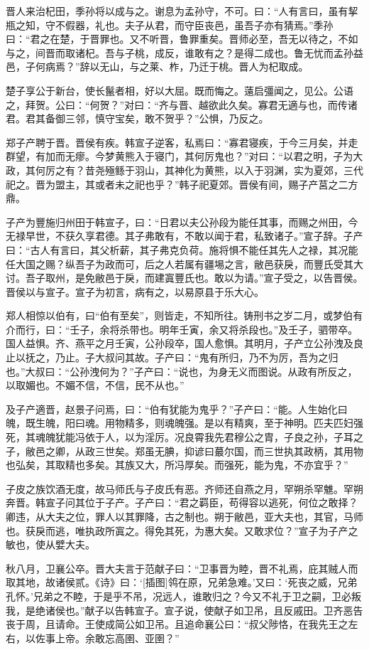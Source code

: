\documentclass[a4paper,12pt,UTF8,twoside]{ctexbook}
\begin{document}
晋人来治杞田，季孙将以成与之。谢息为孟孙守，不可。曰：“人有言曰，虽有挈瓶之知，守不假器，礼也。夫子从君，而守臣丧邑，虽吾子亦有猜焉。”季孙曰：“君之在楚，于晋罪也。又不听晋，鲁罪重矣。晋师必至，吾无以待之，不如与之，间晋而取诸杞。吾与子桃，成反，谁敢有之？是得二成也。鲁无忧而孟孙益邑，子何病焉？”辞以无山，与之莱、柞，乃迁于桃。晋人为杞取成。

楚子享公于新台，使长鬣者相，好以大屈。既而悔之。薳启彊闻之，见公。公语之，拜贺。公曰：“何贺？”对曰：“齐与晋、越欲此久矣。寡君无適与也，而传诸君。君其备御三邻，慎守宝矣，敢不贺乎？”公惧，乃反之。

郑子产聘于晋。晋侯有疾。韩宣子逆客，私焉曰：“寡君寝疾，于今三月矣，并走群望，有加而无瘳。今梦黄熊入于寝门，其何厉鬼也？”对曰：“以君之明，子为大政，其何厉之有？昔尧殛鲧于羽山，其神化为黄熊，以入于羽渊，实为夏郊，三代祀之。晋为盟主，其或者未之祀也乎？”韩子祀夏郊。晋侯有间，赐子产莒之二方鼎。

子产为豐施归州田于韩宣子，曰：“日君以夫公孙段为能任其事，而赐之州田，今无禄早世，不获久享君德。其子弗敢有，不敢以闻于君，私致诸子。”宣子辞。子产曰：“古人有言曰，其父析薪，其子弗克负荷。施将惧不能任其先人之禄，其况能任大国之赐？纵吾子为政而可，后之人若属有疆埸之言，敝邑获戾，而豐氏受其大讨。吾子取州，是免敝邑于戾，而建寘豐氏也。敢以为请。”宣子受之，以告晋侯。晋侯以与宣子。宣子为初言，病有之，以易原县于乐大心。

郑人相惊以伯有，曰“伯有至矣”，则皆走，不知所往。铸刑书之岁二月，或梦伯有介而行，曰：“壬子，余将杀带也。明年壬寅，余又将杀段也。”及壬子，驷带卒。国人益惧。齐、燕平之月壬寅，公孙段卒，国人愈惧。其明月，子产立公孙洩及良止以抚之，乃止。子大叔问其故。子产曰：“鬼有所归，乃不为厉，吾为之归也。”大叔曰：“公孙洩何为？”子产曰：“说也，为身无义而图说。从政有所反之，以取媚也。不媚不信，不信，民不从也。”

及子产適晋，赵景子问焉，曰：“伯有犹能为鬼乎？”子产曰：“能。人生始化曰魄，既生魄，阳曰魂。用物精多，则魂魄强。是以有精爽，至于神明。匹夫匹妇强死，其魂魄犹能冯依于人，以为淫厉。况良霄我先君穆公之胄，子良之孙，子耳之子，敝邑之卿，从政三世矣。郑虽无腆，抑谚曰蕞尔国，而三世执其政柄，其用物也弘矣，其取精也多矣。其族又大，所冯厚矣。而强死，能为鬼，不亦宜乎？”

子皮之族饮酒无度，故马师氏与子皮氏有恶。齐师还自燕之月，罕朔杀罕魋。罕朔奔晋。韩宣子问其位于子产。子产曰：“君之羁臣，苟得容以逃死，何位之敢择？卿违，从大夫之位，罪人以其罪降，古之制也。朔于敝邑，亚大夫也，其官，马师也。获戾而逃，唯执政所寘之。得免其死，为惠大矣。又敢求位？”宣子为子产之敏也，使从嬖大夫。

秋八月，卫襄公卒。晋大夫言于范献子曰：“卫事晋为睦，晋不礼焉，庇其贼人而取其地，故诸侯贰。《诗》曰：‘[插图]鸰在原，兄弟急难。’又曰：‘死丧之威，兄弟孔怀。’兄弟之不睦，于是乎不吊，况远人，谁敢归之？今又不礼于卫之嗣，卫必叛我，是绝诸侯也。”献子以告韩宣子。宣子说，使献子如卫吊，且反戚田。卫齐恶告丧于周，且请命。王使成简公如卫吊。且追命襄公曰：“叔父陟恪，在我先王之左右，以佐事上帝。余敢忘高圉、亚圉？”
\end{document}

